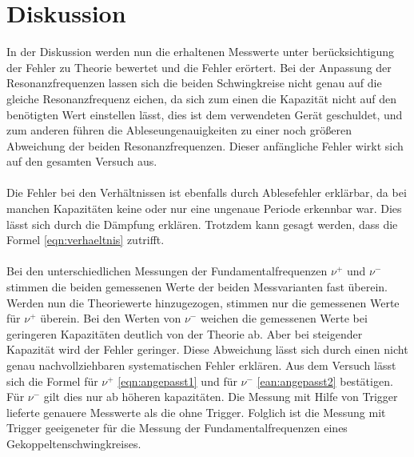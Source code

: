 \section{Diskussion}
In der Diskussion werden nun die erhaltenen Messwerte
unter berücksichtigung der Fehler zu Theorie bewertet und die Fehler erörtert.
Bei der Anpassung der Resonanzfrequenzen lassen sich
die beiden Schwingkreise nicht  genau auf die gleiche Resonanzfrequenz
eichen, da sich zum einen die Kapazität nicht auf den
benötigten Wert einstellen lässt, dies ist dem verwendeten Gerät geschuldet,
und zum anderen führen die Ableseungenauigkeiten zu einer
noch größeren Abweichung der beiden Resonanzfrequenzen.
Dieser anfängliche Fehler wirkt sich auf den gesamten Versuch aus.
\\
\\
Die Fehler bei den Verhältnissen ist ebenfalls durch Ablesefehler
erklärbar, da bei manchen Kapazitäten keine oder nur eine ungenaue
Periode erkennbar war. Dies lässt sich durch die Dämpfung erklären.
Trotzdem kann gesagt werden, dass die Formel \eqref{eqn:verhaeltnis}
zutrifft.
\\
\\
Bei den unterschiedlichen Messungen der
Fundamentalfrequenzen $\nu^+ $ und $\nu^-$
stimmen die beiden gemessenen Werte der beiden
Messvarianten fast überein. Werden nun die
Theoriewerte hinzugezogen, stimmen nur die gemessenen Werte
für $\nu^+$ überein. Bei den Werten
von $\nu^-$ weichen
die gemessenen Werte bei geringeren Kapazitäten
deutlich von der Theorie ab. Aber bei steigender
Kapazität wird der Fehler geringer. Diese Abweichung lässt
sich durch einen nicht genau nachvollziehbaren
systematischen Fehler erklären. Aus dem Versuch lässt sich
die Formel für $ \nu^+$ \eqref{eqn:angepasst1}
und für $\nu^-$ \eqref{ean:angepasst2} bestätigen.
Für $\nu^-$ gilt dies nur ab höheren kapazitäten.
Die Messung mit Hilfe von Trigger lieferte genauere Messwerte
als die ohne Trigger. Folglich ist die Messung mit Trigger
geeigeneter für die Messung der Fundamentalfrequenzen
eines Gekoppeltenschwingkreises.


\label{sec:Diskussion}
